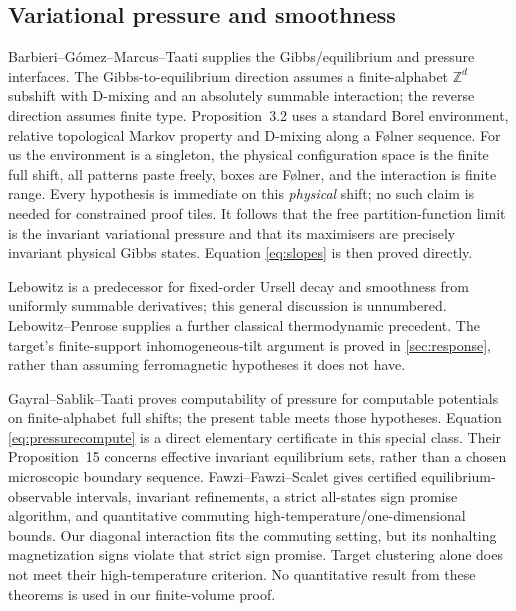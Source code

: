 \documentclass[11pt,reqno]{amsart}
\numberwithin{equation}{section}
\theoremstyle{definition}
\theoremstyle{remark}
\newcommand{\Z}{\mathbb Z}
\begin{document}
\subsection{Variational pressure and smoothness}
Barbieri--G\'omez--Marcus--Taati \cite[Theorem~1.1(a),(b), Proposition~3.2; arXiv version~2]{BarbieriGomezMarcusTaati2020} supplies the Gibbs/equilibrium and pressure interfaces. The Gibbs-to-equilibrium direction assumes a finite-alphabet $\Z^d$ subshift with D-mixing and an absolutely summable interaction; the reverse direction assumes finite type. Proposition~3.2 uses a standard Borel environment, relative topological Markov property and D-mixing along a F\o lner sequence. For us the environment is a singleton, the physical configuration space is the finite full shift, all patterns paste freely, boxes are F\o lner, and the interaction is finite range. Every hypothesis is immediate on this \emph{physical} shift; no such claim is needed for constrained proof tiles. It follows that the free partition-function limit is the invariant variational pressure and that its maximisers are precisely invariant physical Gibbs states. Equation \eqref{eq:slopes} is then proved directly.

Lebowitz \cite[Section~I, (1.12)--(1.13); Section~II, (2.4a,b), pp.~317--318]{Lebowitz1972Correlations} is a predecessor for fixed-order Ursell decay and smoothness from uniformly summable derivatives; this general discussion is unnumbered. Lebowitz--Penrose \cite[Section~VII, (90)--(93)]{LebowitzPenrose1968} supplies a further classical thermodynamic precedent. The target's finite-support inhomogeneous-tilt argument is proved in \cref{sec:response}, rather than assuming ferromagnetic hypotheses it does not have.

Gayral--Sablik--Taati \cite[Proposition~14]{GayralSablikTaati2025} proves computability of pressure for computable potentials on finite-alphabet full shifts; the present table meets those hypotheses. Equation \eqref{eq:pressurecompute} is a direct elementary certificate in this special class. Their Proposition~15 concerns effective invariant equilibrium sets, rather than a chosen microscopic boundary sequence. Fawzi--Fawzi--Scalet \cite[Theorems~2.1--2.4, published numbering]{FawziFawziScalet2024} gives certified equilibrium-observable intervals, invariant refinements, a strict all-states sign promise algorithm, and quantitative commuting high-temperature/one-dimensional bounds. Our diagonal interaction fits the commuting setting, but its nonhalting magnetization signs violate that strict sign promise. Target clustering alone does not meet their high-temperature criterion. No quantitative result from these theorems is used in our finite-volume proof.
\end{document}
